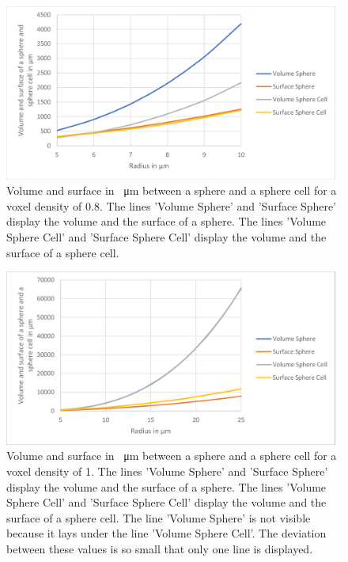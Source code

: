 \begin{figure}[ht]
	\center
	\includegraphics[scale=0.3]{figures/DeviationSphereToPixelSphere-vD0_8.png}
	\caption[Volume and surface in \SI{}{\micro\metre} between a sphere and a sphere cell for a voxel density of 0.8]{Volume and surface in \SI{}{\micro\metre} between a sphere and a sphere cell for a voxel density of 0.8.  The lines 'Volume Sphere' and 'Surface Sphere' display the volume and the surface of a sphere. The lines 'Volume Sphere Cell' and 'Surface Sphere Cell' display the volume and the surface of a sphere cell.}
	\label{img:DeviationSphereCellRealSphere-vD0,8}
\end{figure}

\begin{figure}[ht]
	\center
	\includegraphics[scale=0.3]{figures/DeviationSphereToPixelSphere-vD1.png}
	\caption[Volume and surface in \SI{}{\micro\metre} between a sphere and a sphere cell for a voxel density of 1]{Volume and surface in \SI{}{\micro\metre} between a sphere and a sphere cell for a voxel density of 1.  The lines 'Volume Sphere' and 'Surface Sphere' display the volume and the surface of a sphere. The lines 'Volume Sphere Cell' and 'Surface Sphere Cell' display the volume and the surface of a sphere cell. The line 'Volume Sphere' is not visible because it lays under the line 'Volume Sphere Cell'. The deviation between these values is so small that only one line is displayed.}
	\label{img:DeviationSphereCellRealSphere-vD1}
\end{figure}


